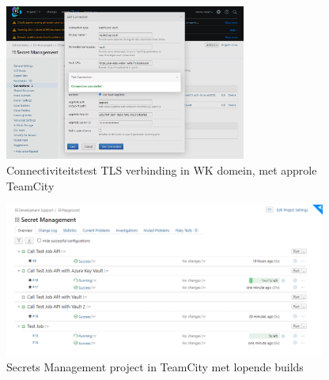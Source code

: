 \begin{figure}[htbp]
\centerline{\includegraphics[width=300]{bachproef/img/poc/test connection.png}}
\caption{Connectiviteitstest TLS verbinding in WK domein, met approle TeamCity \autocite{teamcity}}
\label{fig:approlec}
\end{figure}

\begin{figure}[htbp]
\centerline{\includegraphics[width=400]{bachproef/img/poc/lopendebuilds.png}}
\caption{Secrets Management project in TeamCity met lopende builds \autocite{teamcity}}
\label{fig:project}
\end{figure}